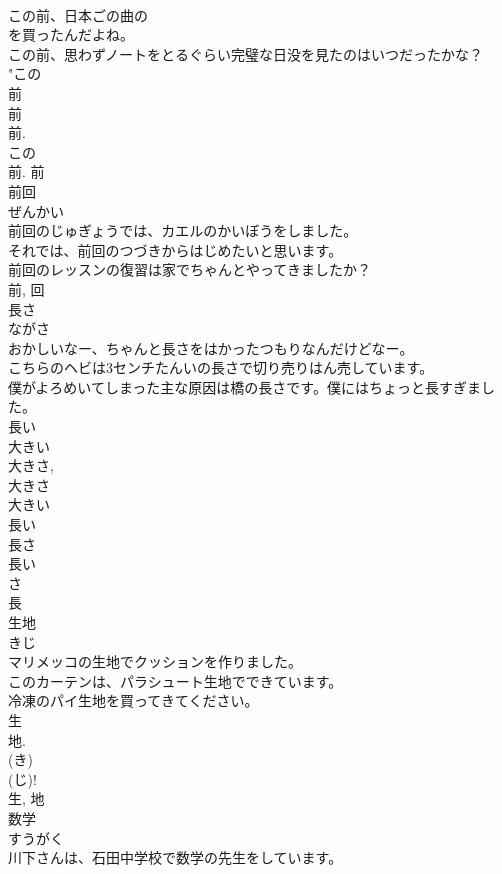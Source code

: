 \documentclass[8pt]{extreport}
\begin{document}
\begin{CJK}{UTF8}{min}
\\	この前、日本ごの曲の
\\	を買ったんだよね。	
\\	この前、思わずノートをとるぐらい完璧な日没を見たのはいつだったかな？	
\\	"この 
\\	前 
\\	前 
\\	前. 
\\	この 
\\	前.	前	
\\	前回	
\\	ぜんかい	
\\	前回のじゅぎょうでは、カエルのかいぼうをしました。	
\\	それでは、前回のつづきからはじめたいと思います。	
\\	前回のレッスンの復習は家でちゃんとやってきましたか？	
\\	前, 回	
\\	長さ	
\\	ながさ	
\\	おかしいなー、ちゃんと長さをはかったつもりなんだけどなー。	
\\	こちらのヘビは3センチたんいの長さで切り売りはん売しています。	
\\	僕がよろめいてしまった主な原因は橋の長さです。僕にはちょっと長すぎました。	
\\	長い 
\\	大きい 
\\	大きさ, 
\\	大きさ 
\\	大きい 
\\	長い 
\\	長さ 
\\	長い 
\\	さ 
\\	長	
\\	生地	
\\	きじ	
\\	マリメッコの生地でクッションを作りました。	
\\	このカーテンは、パラシュート生地でできています。	
\\	冷凍のパイ生地を買ってきてください。	
\\	生 
\\	地. 
\\	(き)
\\	(じ)! 
\\	生, 地	
\\	数学	
\\	すうがく	
\\	川下さんは、石田中学校で数学の先生をしています。	

\end{CJK}
\end{document}
